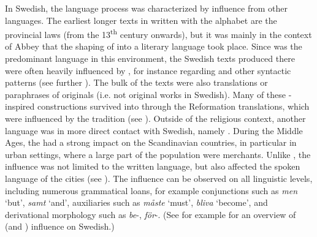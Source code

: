 \documentclass[output=paper]{langscibook}
\begin{document}
In Swedish, the language  process was characterized by influence from other languages. The earliest longer texts in  written with the  alphabet are the provincial laws (from the 13\textsuperscript{th} century onwards), but it was mainly in the context of  Abbey that the shaping of  into a literary language took place. Since  was the predominant language in this environment, the Swedish texts produced there were often heavily influenced by , for instance regarding  and other syntactic patterns (see further \citealt{Hoder2009, Hoder2010, Wollin1981, Wollin1983}). The bulk of the texts were also translations or paraphrases of  originals (i.e. not original works in Swedish). Many of these -inspired constructions survived into  through the Reformation  translations, which were influenced by the  tradition (see \citealt{Stahle1970, Teleman2002, Teleman2003Swedish}). Outside of the religious context, another language was in more direct contact with Swedish, namely . During the Middle Ages, the  had a strong impact on the Scandinavian countries, in particular in urban settings, where a large part of the population were  merchants. Unlike , the  influence was not limited to the written language, but also affected the spoken language of the cities (see \citealt{Braunmuller1997,Braunmuller2005,}). The influence can be observed on all linguistic levels, including numerous grammatical loans, for example conjunctions such as \textit{men} ‘but’, \textit{samt} ‘and’, auxiliaries such as \textit{måste} ‘must’, \textit{bliva} ‘become’, and derivational morphology such as \textit{be}{}-, \textit{för}{}-. (See for example \citealt{Braunmuller2005} for an overview of  (and ) influence on Swedish.)
\end{document}
